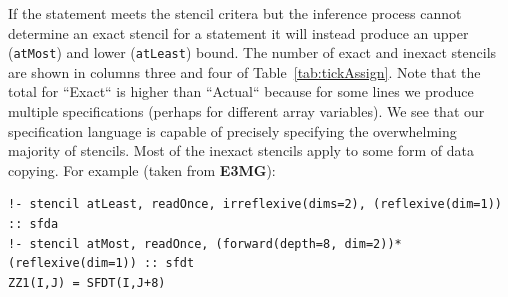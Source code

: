 \documentclass[9pt]{sigplanconf}
\theoremstyle{definition}
\newcommand{\term}[1]{\texttt{#1}}
\begin{document}







If the statement meets the stencil critera but the inference process
cannot determine an exact stencil for a statement it will instead
produce an upper (\term{atMost}) and lower (\term{atLeast}) bound. The
number of exact and inexact stencils are shown in columns three and
four of Table~\ref{tab:tickAssign}. Note that the total for ``Exact``
is higher than ``Actual`` because for some lines we produce multiple
specifications (perhaps for different array variables).
We see that our specification language is capable of precisely specifying the overwhelming majority of stencils. Most of the inexact stencils apply to some form of data copying. For example (taken from \textbf{E3MG}):
\begin{verbatim}
!- stencil atLeast, readOnce, irreflexive(dims=2), (reflexive(dim=1)) :: sfda
!- stencil atMost, readOnce, (forward(depth=8, dim=2))*(reflexive(dim=1)) :: sfdt
ZZ1(I,J) = SFDT(I,J+8)
\end{verbatim}
\end{document}
